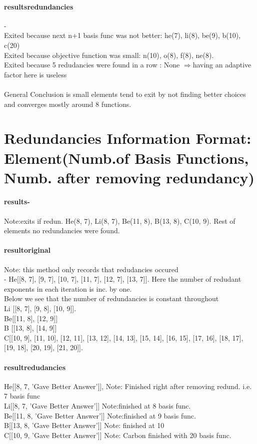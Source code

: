 \documentclass[]{article}
\begin{document}
\paragraph{results\textunderscore redundancies}- \\
Exited because next n+1 basis func was not better: he(7), li(8), be(9), b(10), c(20) \\
Exited because objective function was small: n(10), o(8), f(8), ne(8).\\
Exited because 5 redudancies were found in a row : None $\Rightarrow$having an adaptive factor here is useless\\ \\ 
General Conclusion is small elements tend to exit by not finding better choices and converges mostly around 8 functions.

\section{Redundancies Information Format: Element(Numb.of Basis Functions, Numb. after removing redundancy)}
\paragraph{results-}Note:exits if redun. He(8, 7), Li(8, 7), Be(11, 8), B(13, 8), C(10, 9). Rest of elements no redundancies were found.
\paragraph{result\textunderscore original} Note: this method only records that redudancies occured\\- He[[8, 7], [9, 7], [10, 7], [11, 7], [12, 7], [13, 7]]. Here the number of redudant exponents in each iteration is inc. by one.\\ 
Below we see that the number of redundancies is constant throughout\\
Li [[8, 7], [9, 8], [10, 9]]. \\
Be[[11, 8], [12, 9]] \\
B [[13, 8], [14, 9]]\\ C[[10, 9], [11, 10], [12, 11], [13, 12], [14, 13], [15, 14], [16, 15], [17, 16], [18, 17], [19, 18], [20, 19], [21, 20]].


\paragraph{result\textunderscore redudancies}
He[[8, 7, 'Gave Better Answer']], Note: Finished right after removing redund. i.e. 7 basis func \\
Li[[8, 7, 'Gave Better Answer']] Note:finished at  8 basis func.\\
Be[[11, 8, 'Gave Better Answer']] Note:finished at 9 basis func.\\
B[[13, 8, 'Gave Better Answer']] Note: finished at 10\\
C[[10, 9, 'Gave Better Answer']] Note: Carbon finished with 20 basis func.\\
\end{document}
